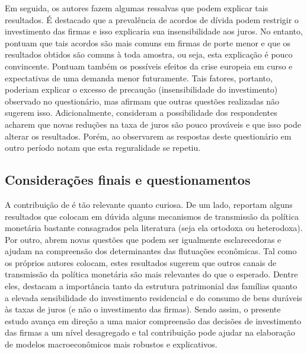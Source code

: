 \documentclass[11pt]{article}
\begin{document}
Em seguida, os autores fazem algumas ressalvas que podem explicar tais resultados.
É destacado que a prevalência de acordos de dívida podem restrigir o investimento das firmas e isso explicaria sua insensibilidade aos juros.
No entanto, pontuam que tais acordos são mais comuns em firmas de porte menor e que os resultados obtidos são comuns à toda amostra, ou seja, esta explicação é pouco convincente.
Pontuam também os possíveis efeitos da crise europeia em curso e expectativas de uma demanda menor futuramente.
Tais fatores, portanto, poderiam explicar o excesso de precaução (insensibilidade do investimento) observado no questionário, mas afirmam que outras questões realizadas não sugerem isso.
Adicionalmente, consideram a possibilidade dos respondentes acharem que novas reduções na taxa de juros são pouco prováveis e que isso pode alterar os resultados.
Porém, ao observarem as respostas deste questionário em outro período notam que esta reguralidade se repetiu.

\subsection*{Considerações finais e questionamentos}
\label{sec:org6b9c155}

A contribuição de \textcite{sharpe_2020_Why} é tão relevante quanto curiosa.
De um lado, reportam alguns resultados que colocam em dúvida alguns mecanismos de transmissão da política monetária bastante consagrados pela literatura (seja ela ortodoxa ou heterodoxa).
Por outro, abrem novas questões que podem ser igualmente esclarecedoras e ajudam na compreensão dos determinantes das flutuações econômicas.
Tal como os próprios autores colocam, estes resultados sugerem que outros canais de transmissão da política monetária são mais relevantes do que o esperado.
Dentre eles, destacam a importância tanto da estrutura patrimonial das famílias quanto a elevada sensibilidade do investimento residencial e do consumo de bens duráveis às taxas de juros (e não o investimento das firmas).
Sendo assim, o presente estudo avança em direção a uma maior compreensão das decisões de investimento das firmas a um nível desagregado e tal contribuição pode ajudar na elaboração de modelos macroeconômicos mais robustos e explicativos.
\end{document}
